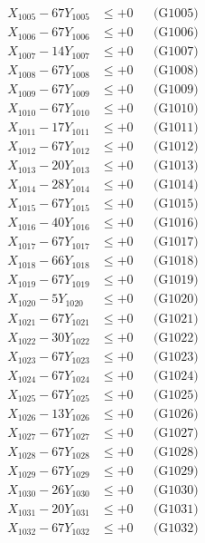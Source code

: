\documentclass[a4paper,10pt]{article}
\begin{document}
{\begin{align}
X_{1005} - 67Y_{1005} &\leq +0 && \text{(G1005)} \\
X_{1006} - 67Y_{1006} &\leq +0 && \text{(G1006)} \\
X_{1007} - 14Y_{1007} &\leq +0 && \text{(G1007)} \\
X_{1008} - 67Y_{1008} &\leq +0 && \text{(G1008)} \\
X_{1009} - 67Y_{1009} &\leq +0 && \text{(G1009)} \\
X_{1010} - 67Y_{1010} &\leq +0 && \text{(G1010)} \\
\allowbreak
X_{1011} - 17Y_{1011} &\leq +0 && \text{(G1011)} \\
X_{1012} - 67Y_{1012} &\leq +0 && \text{(G1012)} \\
X_{1013} - 20Y_{1013} &\leq +0 && \text{(G1013)} \\
X_{1014} - 28Y_{1014} &\leq +0 && \text{(G1014)} \\
X_{1015} - 67Y_{1015} &\leq +0 && \text{(G1015)} \\
X_{1016} - 40Y_{1016} &\leq +0 && \text{(G1016)} \\
X_{1017} - 67Y_{1017} &\leq +0 && \text{(G1017)} \\
X_{1018} - 66Y_{1018} &\leq +0 && \text{(G1018)} \\
X_{1019} - 67Y_{1019} &\leq +0 && \text{(G1019)} \\
X_{1020} - 5Y_{1020} &\leq +0 && \text{(G1020)} \\
\allowbreak
X_{1021} - 67Y_{1021} &\leq +0 && \text{(G1021)} \\
X_{1022} - 30Y_{1022} &\leq +0 && \text{(G1022)} \\
X_{1023} - 67Y_{1023} &\leq +0 && \text{(G1023)} \\
X_{1024} - 67Y_{1024} &\leq +0 && \text{(G1024)} \\
X_{1025} - 67Y_{1025} &\leq +0 && \text{(G1025)} \\
X_{1026} - 13Y_{1026} &\leq +0 && \text{(G1026)} \\
X_{1027} - 67Y_{1027} &\leq +0 && \text{(G1027)} \\
X_{1028} - 67Y_{1028} &\leq +0 && \text{(G1028)} \\
X_{1029} - 67Y_{1029} &\leq +0 && \text{(G1029)} \\
X_{1030} - 26Y_{1030} &\leq +0 && \text{(G1030)} \\
\allowbreak
X_{1031} - 20Y_{1031} &\leq +0 && \text{(G1031)} \\
X_{1032} - 67Y_{1032} &\leq +0 && \text{(G1032)} \\

\end{align}}
\end{document}
